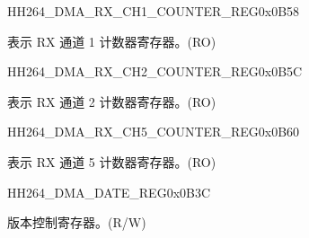 \begin{register}{H}{H264\_DMA\_RX\_CH1\_COUNTER\_REG}{0x0B58}\label{regdesc:H264DMARXCH1COUNTERREG}
%
%
\regnewline%
\begin{regdesc}\begin{reglist}
\label{fielddesc:H264DMARXCH1CNT}\item [H264\_DMA\_RX\_CH1\_CNT] 表示 RX 通道 1 计数器寄存器。(RO)
\end{reglist}\end{regdesc}
\end{register}


\begin{register}{H}{H264\_DMA\_RX\_CH2\_COUNTER\_REG}{0x0B5C}\label{regdesc:H264DMARXCH2COUNTERREG}
%
%
\regnewline%
\begin{regdesc}\begin{reglist}
\label{fielddesc:H264DMARXCH2CNT}\item [H264\_DMA\_RX\_CH2\_CNT] 表示 RX 通道 2 计数器寄存器。(RO)
\end{reglist}\end{regdesc}
\end{register}


\begin{register}{H}{H264\_DMA\_RX\_CH5\_COUNTER\_REG}{0x0B60}\label{regdesc:H264DMARXCH5COUNTERREG}
%
%
\regnewline%
\begin{regdesc}\begin{reglist}
\label{fielddesc:H264DMARXCH5CNT}\item [H264\_DMA\_RX\_CH5\_CNT] 表示 RX 通道 5 计数器寄存器。(RO)
\end{reglist}\end{regdesc}
\end{register}

\begin{register}{H}{H264\_DMA\_DATE\_REG}{0x0B3C}\label{regdesc:H264DMADATEREG}
%
\regnewline%
\begin{regdesc}\begin{reglist}
\label{fielddesc:H264DMADATE}\item [H264\_DMA\_DATE] 版本控制寄存器。(R/W)
\end{reglist}\end{regdesc}
\end{register}
